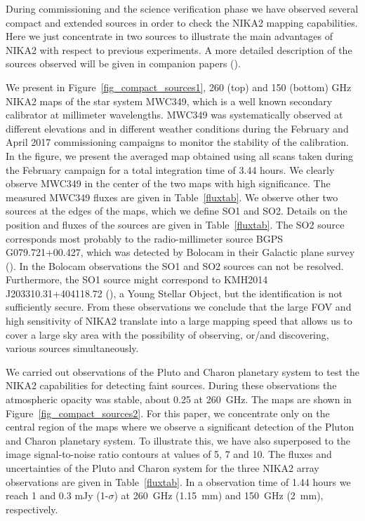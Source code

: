 \documentclass[]{aa} %
\begin{document}

During commissioning and the science verification phase we have observed several compact and extended sources in order to check the NIKA2 mapping capabilities. Here we just concentrate in two sources to illustrate the main advantages of NIKA2 with respect to previous experiments. A more detailed description of the sources observed will be given in companion papers (\cite{commissioning,pipeline}).

We present in Figure~\ref{fig_compact_sources1}, 260 (top) and 150 (bottom) GHz NIKA2 maps of the star system MWC349, which is a well known secondary calibrator at millimeter wavelengths. MWC349 was systematically observed at different elevations and in different weather conditions during the February and April 2017 commissioning campaigns to monitor the stability of the calibration. In the figure, we present the averaged map obtained using all scans taken during the February campaign for a total integration time of 3.44 hours. We clearly observe MWC349 in the center of the two maps with high significance. The measured MWC349 fluxes are given in Table~\ref{fluxtab}. We observe other two sources at the edges of the maps, which we define SO1 and SO2. Details on the position and fluxes of the sources are given in Table~\ref{fluxtab}. The SO2 source corresponds most probably to the radio-millimeter source BGPS G079.721+00.427, which was detected by Bolocam in their Galactic plane survey (\cite{Rosolowsky2010}). In the Bolocam observations the SO1 and SO2 sources can not be resolved. Furthermore, the SO1 source might correspond to  KMH2014 J203310.31+404118.72 (\cite{Kryukova2014}), a Young Stellar Object, but the identification is not sufficiently secure.
From these observations we conclude that the large FOV and high sensitivity of NIKA2 translate into a large mapping speed that allows us to cover a large sky area with the possibility of observing, or/and discovering, various sources simultaneously. 

We carried out observations of the Pluto and Charon planetary system to test the NIKA2 capabilities for detecting faint sources. During these observations the atmospheric opacity was stable, about 0.25 at 260~GHz. The maps are shown in Figure~\ref{fig_compact_sources2}. For this paper, we concentrate only on the central region of the maps where we observe a significant detection of the Pluton and Charon planetary system. To illustrate this, we have also superposed to the image signal-to-noise ratio contours at values of 5, 7 and 10. The fluxes and uncertainties of the Pluto and Charon system for the three NIKA2 array observations are given in Table~\ref{fluxtab}. In a observation time of 1.44 hours we reach 1 and 0.3 mJy (1-$\sigma$) at 260~GHz (1.15~mm) and 150~GHz (2~mm), respectively.
\end{document}
